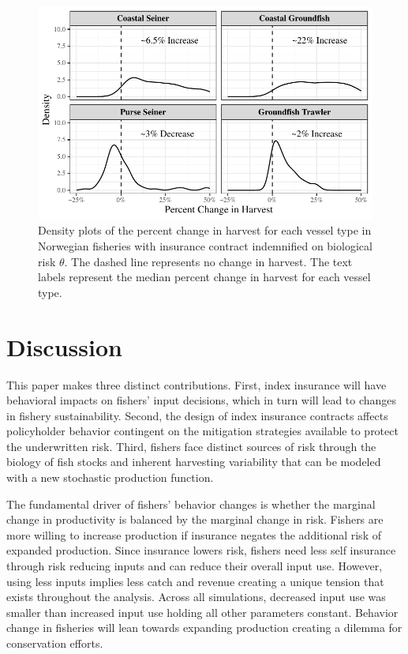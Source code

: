 \documentclass[
  letterpaper,
  DIV=11,
  numbers=noendperiod]{scrartcl}
\theoremstyle{plain}
\theoremstyle{plain}
\theoremstyle{remark}
\begin{document}
\begin{figure}

{\centering \includegraphics{ibi-behavior_files/figure-pdf/fig-asche-theta-1.pdf}

}

\caption{\label{fig-asche-theta}Density plots of the percent change in
harvest for each vessel type in Norwegian fisheries with insurance
contract indemnified on biological risk \(\theta\). The dashed line
represents no change in harvest. The text labels represent the median
percent change in harvest for each vessel type.}

\end{figure}

\hypertarget{sec-disc}{%
\section{Discussion}\label{sec-disc}}

This paper makes three distinct contributions. First, index insurance
will have behavioral impacts on fishers' input decisions, which in turn
will lead to changes in fishery sustainability. Second, the design of
index insurance contracts affects policyholder behavior contingent on
the mitigation strategies available to protect the underwritten risk.
Third, fishers face distinct sources of risk through the biology of fish
stocks and inherent harvesting variability that can be modeled with a
new stochastic production function.

The fundamental driver of fishers' behavior changes is whether the
marginal change in productivity is balanced by the marginal change in
risk. Fishers are more willing to increase production if insurance
negates the additional risk of expanded production. Since insurance
lowers risk, fishers need less self insurance through risk reducing
inputs and can reduce their overall input use. However, using less
inputs implies less catch and revenue creating a unique tension that
exists throughout the analysis. Across all simulations, decreased input
use was smaller than increased input use holding all other parameters
constant. Behavior change in fisheries will lean towards expanding
production creating a dilemma for conservation efforts.
\end{document}
